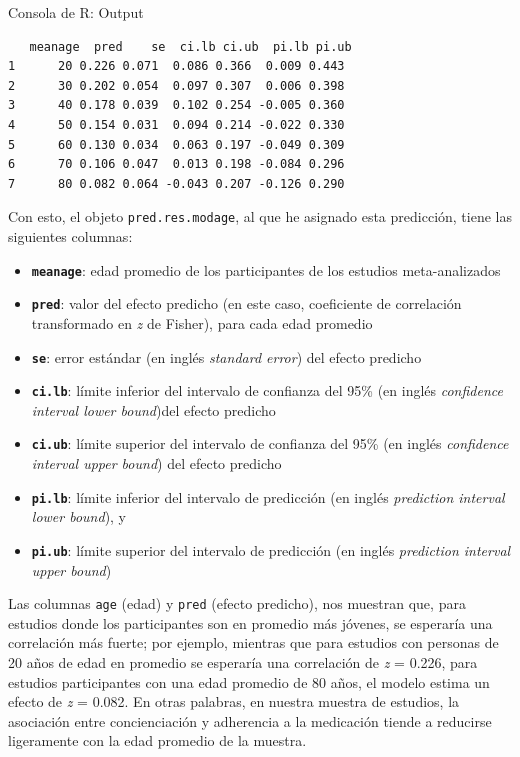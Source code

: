 \documentclass[
  bookmarksnumbered]{article}
\begin{document}
\begin{ROut}{Consola de R: Output~\thetcbcounter}
                \begin{footnotesize}
                \begin{verbatim}   meanage  pred    se  ci.lb ci.ub  pi.lb pi.ub
1      20 0.226 0.071  0.086 0.366  0.009 0.443
2      30 0.202 0.054  0.097 0.307  0.006 0.398
3      40 0.178 0.039  0.102 0.254 -0.005 0.360
4      50 0.154 0.031  0.094 0.214 -0.022 0.330
5      60 0.130 0.034  0.063 0.197 -0.049 0.309
6      70 0.106 0.047  0.013 0.198 -0.084 0.296
7      80 0.082 0.064 -0.043 0.207 -0.126 0.290
 \end{verbatim}
                \end{footnotesize}
                \end{ROut}

Con esto, el objeto \texttt{pred.res.modage}, al que he asignado esta predicción, tiene las siguientes columnas:

\begin{itemize}
\item
  \textbf{\texttt{meanage}}: edad promedio de los participantes de los estudios meta-analizados
\item
  \textbf{\texttt{pred}}: valor del efecto predicho (en este caso, coeficiente de correlación transformado en \emph{z} de Fisher), para cada edad promedio
\item
  \textbf{\texttt{se}}: error estándar (en inglés \emph{standard error}) del efecto predicho
\item
  \textbf{\texttt{ci.lb}}: límite inferior del intervalo de confianza del 95\% (en inglés \emph{confidence interval lower bound})del efecto predicho
\item
  \textbf{\texttt{ci.ub}}: límite superior del intervalo de confianza del 95\% (en inglés \emph{confidence interval upper bound}) del efecto predicho
\item
  \textbf{\texttt{pi.lb}}: límite inferior del intervalo de predicción (en inglés \emph{prediction interval lower bound}), y
\item
  \textbf{\texttt{pi.ub}}: límite superior del intervalo de predicción (en inglés \emph{prediction interval upper bound})
\end{itemize}

Las columnas \texttt{age} (edad) y \texttt{pred} (efecto predicho), nos muestran que, para estudios donde los participantes son en promedio más jóvenes, se esperaría una correlación más fuerte; por ejemplo, mientras que para estudios con personas de 20 años de edad en promedio se esperaría una correlación de \emph{z} = 0.226, para estudios participantes con una edad promedio de 80 años, el modelo estima un efecto de \emph{z} = 0.082. En otras palabras, en nuestra muestra de estudios, la asociación entre concienciación y adherencia a la medicación tiende a reducirse ligeramente con la edad promedio de la muestra.
\end{document}
